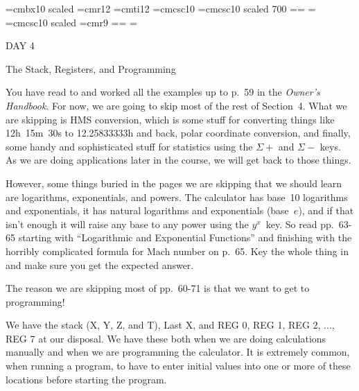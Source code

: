 
\def\folio{\ifnum\pageno>0 \number\pageno \else
   \ifnum\pageno<0 \romannumeral-\pageno \else\fi\fi}

\font\largebf=cmbx10  scaled 
\font\largerm=cmr12
\font\largeit=cmti12
\font\tensc=cmcsc10
\font\sevensc=cmcsc10 scaled 700
\newfam\scfam \def\sc{\fam\scfam\tensc}
\textfont\scfam=\tensc \scriptfont\scfam=\sevensc
\scriptscriptfont\scfam=\sevensc
\font\largesc=cmcsc10 scaled 
\font\ninerm=cmr9
\newfam\srfam \def\sr{\fam\srfam\ninerm}
\textfont\srfam=\ninerm \scriptfont\srfam=\sevenrm
\scriptscriptfont\srfam=\fiverm




\null\vskip36pt

\centerline{\largerm DAY 4}
\nobreak\bigskip

\centerline{\largeit The Stack, Registers, and Programming}
\nobreak\bigskip

\nobreak\bigskip

\noindent You have read to and worked all the examples up to p.~59 in the {\it Owner's Handbook}. For now, we are going to skip most of the rest of Section~4. What we are skipping is HMS conversion, which is some stuff for converting things like 12h~15m~30s to 12.25833333h and back, polar coordinate conversion, and finally, some handy and sophisticated stuff for statistics using the $\Sigma+$ and $\Sigma-$ keys. As we are doing applications later in the course, we will get back to those things.

However, some things buried in the pages we are skipping that we should learn are logarithms, exponentials, and powers. The calculator has base~10 logarithms and exponentials, it has natural logarithms and exponentials (base~$e$), and if that isn't enough it will raise any base to any power using the $y^x$~key. So read pp.~63-65 starting with ``Logarithmic and Exponential Functions'' and finishing with the horribly complicated formula for Mach number on p.~65. Key the whole thing in and make sure you get the expected answer.

The reason we are skipping most of pp.~60-71 is that we want to get to programming!

\bigskip

\nobreak\bigskip

\noindent We have the stack  (X, Y, Z, and T), Last X, and REG 0, REG 1, REG 2, ..., REG 7 at our disposal. We have these both when we are doing calculations manually and when we are programming the calculator. It is extremely common, when running a program, to have to enter initial values into one or more of these locations before starting the program.

